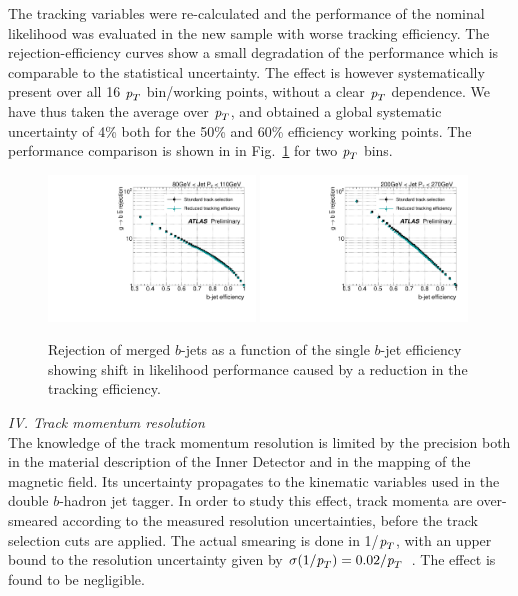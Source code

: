 The tracking variables were re-calculated and the performance of the nominal likelihood was evaluated in the new sample with worse tracking efficiency. The rejection-efficiency curves %
 show a small degradation of the performance which is comparable to the statistical uncertainty. The effect is however systematically present over all 16 ${\emph{p}_{T}}$ bin/working points, without a clear ${\emph{p}_{T}}$ dependence. We have thus taken the average over ${\emph{p}_{T}}$, and obtained a global systematic uncertainty of 4\% both for the 50\% and 60\% efficiency working points. The performance comparison is shown in in Fig.~\ref{fig:trackefficiency} for two ${\emph{p}_{T}}$ bins. %

\begin{figure}[tp]
\centering
\includegraphics[width=0.49\textwidth]{FIGS/systematics/LlhoodKDE_ISO_TrackingUncertaintyTest_rejvseff080.pdf}
\includegraphics[width=0.49\textwidth]{FIGS/systematics/LlhoodKDE_ISO_TrackingUncertaintyTest_rejvseff200.pdf}
\caption{Rejection of merged $b$-jets as a function of the single $b$-jet efficiency showing shift in likelihood performance caused by a reduction in the tracking efficiency.}
\label{fig:trackefficiency}
\end{figure}

\vspace{3mm}
{\em IV. Track momentum resolution}
\\[3mm]
The knowledge of the track momentum resolution is limited by the precision both in the material description of the Inner Detector and in the mapping of the magnetic field. Its uncertainty propagates to the kinematic variables used in the double $b$-hadron jet tagger. In order to study this effect, track momenta are over-smeared according to the measured resolution uncertainties, before the track selection cuts are applied.  %
The actual smearing is done in 1/${\emph{p}_{T}}$, with an upper bound to the resolution uncertainty given by $\sigma(1/{\emph{p}_{T}})=0.02/{\emph{p}_{T}}$~\cite{ATLAS-CONF-2010-009}. The effect is found to be negligible. %

